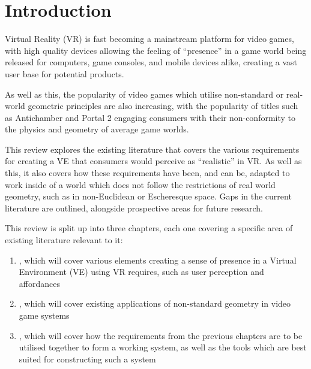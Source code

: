 \section{Introduction}
\label{lr:intro}
	
\begin{multicols*}{2}
	Virtual Reality (VR) is fast becoming a mainstream platform for video games, with high quality devices allowing the feeling of \enquote{presence} in a game world being released for computers, game consoles, and mobile devices alike, creating a vast user base for potential products.

	As well as this, the popularity of video games which utilise non-standard or real-world geometric principles are also increasing, with the popularity of titles such as Antichamber \cite{Antichamber2013} and Portal 2 \cite{Portal22011} engaging consumers with their non-conformity to the physics and geometry of average game worlds.

	This review explores the existing literature that covers the various requirements for creating a VE that consumers would perceive as \enquote{realistic} in VR.
	As well as this, it also covers how these requirements have been, and can be, adapted to work inside of a world which does not follow the restrictions of real world geometry, such as in non-Euclidean or Escheresque space.
	Gaps in the current literature are outlined, alongside prospective areas for future research.

	This review is split up into three chapters, each one covering a specific area of existing literature relevant to it:
	\begin{enumerate}
		\item {}, which will cover various elements creating a sense of presence in a Virtual Environment (VE) using VR requires, such as user perception and affordances
		\item {}, which will cover existing applications of non-standard geometry in video game systems
		\item {}, which will cover how the requirements from the previous chapters are to be utilised together to form a working system, as well as the tools which are best suited for constructing such a system
	\end{enumerate}

\end{multicols*}

